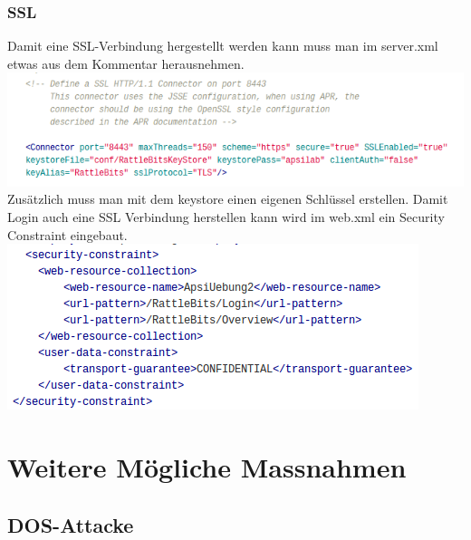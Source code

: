 \documentclass[10pt]{article}
\begin{document}
\subsubsection{SSL}
Damit eine SSL-Verbindung hergestellt werden kann muss man im server.xml etwas aus dem Kommentar herausnehmen.\\
\includegraphics[scale=.5]{ssl.png}\\
Zusätzlich muss man mit dem keystore einen eigenen Schlüssel erstellen.
Damit Login auch eine SSL Verbindung herstellen kann wird im web.xml ein Security Constraint eingebaut.\\
\includegraphics[scale=.5]{web_xml.png}
\section{Weitere M\"{o}gliche Massnahmen}

\subsection{DOS-Attacke}


 
\end{document}
